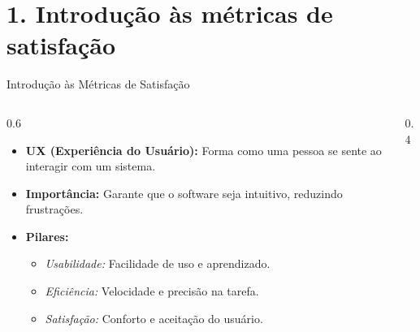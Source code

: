 \documentclass[aspectratio=169]{beamer}
\begin{document}
\section{1. Introdução às métricas de satisfação}

\begin{frame}{Introdução às Métricas de Satisfação}
    \begin{columns}
        \begin{column}{0.6\textwidth}
            \begin{itemize}
                \item \textbf{UX (Experiência do Usuário):} Forma como uma pessoa se sente ao interagir com um sistema.
                \item \textbf{Importância:} Garante que o software seja intuitivo, reduzindo frustrações.
                \item \textbf{Pilares:}
                \begin{itemize}
                    \item \textit{Usabilidade:} Facilidade de uso e aprendizado.
                    \item \textit{Eficiência:} Velocidade e precisão na tarefa.
                    \item \textit{Satisfação:} Conforto e aceitação do usuário.
                \end{itemize}
            \end{itemize}
        \end{column}
        \begin{column}{0.4\textwidth}
            \begin{center}
            \end{center}
        \end{column}
    \end{columns}
\end{frame}
\end{document}
